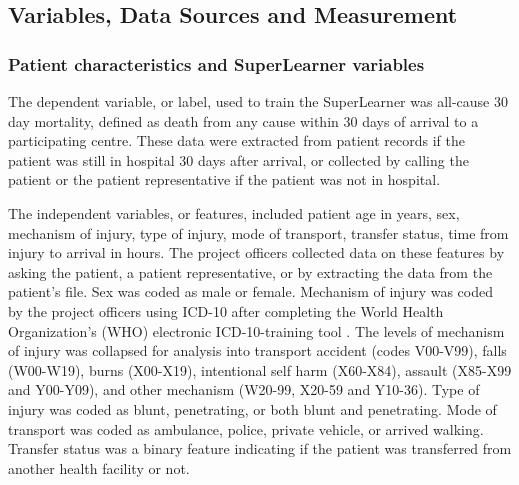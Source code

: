 \documentclass[10pt,letterpaper]{article}\usepackage[]{graphicx}\usepackage[]{color}
\begin{document}
\subsection*{Variables, Data Sources and Measurement}
\subsubsection*{Patient characteristics and SuperLearner variables}
The dependent variable, or label, used to train the SuperLearner was all-cause
30 day mortality, defined as death from any cause within 30 days of arrival to a
participating centre. These data were extracted from patient records if the
patient was still in hospital 30 days after arrival, or collected by calling the
patient or the patient representative if the patient was not in hospital.

The independent variables, or features, included patient age in years, sex,
mechanism of injury, type of injury, mode of transport, transfer status, time
from injury to arrival in hours. The project officers collected data on these
features by asking the patient, a patient representative, or by extracting the
data from the patient's file. Sex was coded as male or female. Mechanism of
injury was coded by the project officers using ICD-10 after completing the World
Health Organization's (WHO) electronic ICD-10-training tool \cite{WHOICD}. The
levels of mechanism of injury was collapsed for analysis into transport accident
(codes V00-V99), falls (W00-W19), burns (X00-X19), intentional self harm
(X60-X84), assault (X85-X99 and Y00-Y09), and other mechanism (W20-99, X20-59
and Y10-36). Type of injury was coded as blunt, penetrating, or both blunt and
penetrating. Mode of transport was coded as ambulance, police, private vehicle,
or arrived walking. Transfer status was a binary feature indicating if the
patient was transferred from another health facility or not.
\end{document}
